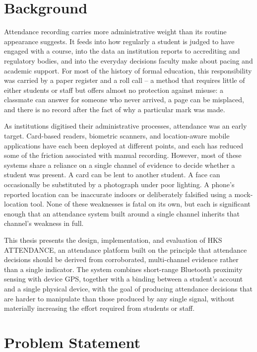 \documentclass[12pt, a4paper, oneside]{report}
\begin{document}
\section{Background}
\label{sec:background}

Attendance recording carries more administrative weight than its routine appearance suggests. It feeds into how regularly a student is judged to have engaged with a course, into the data an institution reports to accrediting and regulatory bodies, and into the everyday decisions faculty make about pacing and academic support. For most of the history of formal education, this responsibility was carried by a paper register and a roll call -- a method that requires little of either students or staff but offers almost no protection against misuse: a classmate can answer for someone who never arrived, a page can be misplaced, and there is no record after the fact of why a particular mark was made.

As institutions digitised their administrative processes, attendance was an early target. Card-based readers, biometric scanners, and location-aware mobile applications have each been deployed at different points, and each has reduced some of the friction associated with manual recording. However, most of these systems share a reliance on a single channel of evidence to decide whether a student was present. A card can be lent to another student. A face can occasionally be substituted by a photograph under poor lighting. A phone's reported location can be inaccurate indoors or deliberately falsified using a mock-location tool. None of these weaknesses is fatal on its own, but each is significant enough that an attendance system built around a single channel inherits that channel's weakness in full.

This thesis presents the design, implementation, and evaluation of HKS ATTENDANCE, an attendance platform built on the principle that attendance decisions should be derived from corroborated, multi-channel evidence rather than a single indicator. The system combines short-range Bluetooth proximity sensing with device GPS, together with a binding between a student's account and a single physical device, with the goal of producing attendance decisions that are harder to manipulate than those produced by any single signal, without materially increasing the effort required from students or staff.

\section{Problem Statement}
\label{sec:problem-statement}
\end{document}
